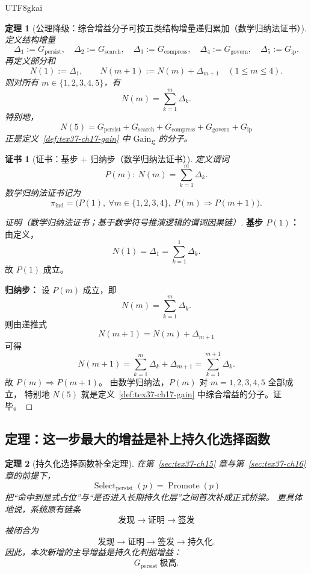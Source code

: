 \documentclass[12pt]{article}
\newtheorem{theorem}{定理}[section]
\newtheorem{Certificate}{证书}[section]
\newcommand{\Select}{\operatorname{Select}}
\newcommand{\Promote}{\operatorname{Promote}}
\begin{document}
\begin{CJK*}{UTF8}{gkai}
\begin{theorem}[公理降级：综合增益分子可按五类结构增量递归累加（数学归纳法证书）]
\label{thm:tex37-ch17-decomposition}
定义结构增量
\[
  \Delta_1:=G_{\mathrm{persist}},\quad
  \Delta_2:=G_{\mathrm{search}},\quad
  \Delta_3:=G_{\mathrm{compress}},\quad
  \Delta_4:=G_{\mathrm{govern}},\quad
  \Delta_5:=G_{\mathrm{ip}}.
\]
再定义部分和
\[
  N(1):=\Delta_1,
  \qquad
  N(m+1):=N(m)+\Delta_{m+1}
  \quad (1\le m\le 4).
\]
则对所有 $m\in\{1,2,3,4,5\}$，有
\[
  N(m)=\sum_{k=1}^{m}\Delta_k.
\]
特别地，
\[
  N(5)
  =
  G_{\mathrm{persist}}
  +
  G_{\mathrm{search}}
  +
  G_{\mathrm{compress}}
  +
  G_{\mathrm{govern}}
  +
  G_{\mathrm{ip}}
\]
正是定义~\ref{def:tex37-ch17-gain} 中 $\mathrm{Gain}_{\mathfrak L}$ 的分子。
\end{theorem}

\begin{Certificate}[证书：基步 + 归纳步（数学归纳法证书）]
\label{cert:tex37-ch17-decomposition}
定义谓词
\[
  P(m):\ N(m)=\sum_{k=1}^{m}\Delta_k.
\]
数学归纳法证书记为
\[
  \pi_{\mathrm{ind}}
  =
  \bigl(
    P(1),\
    \forall m\in\{1,2,3,4\},\ P(m)\Rightarrow P(m+1)
  \bigr).
\]
\end{Certificate}

\begin{proof}[证明（数学归纳法证书；基于数学符号推演逻辑的谓词因果链）]
\textbf{基步 $P(1)$：}
由定义，
\[
  N(1)=\Delta_1=\sum_{k=1}^{1}\Delta_k.
\]
故 $P(1)$ 成立。

\textbf{归纳步：}
设 $P(m)$ 成立，即
\[
  N(m)=\sum_{k=1}^{m}\Delta_k.
\]
则由递推式
\[
  N(m+1)=N(m)+\Delta_{m+1}
\]
可得
\[
  N(m+1)
  =
  \sum_{k=1}^{m}\Delta_k+\Delta_{m+1}
  =
  \sum_{k=1}^{m+1}\Delta_k.
\]
故 $P(m)\Rightarrow P(m+1)$。
由数学归纳法，$P(m)$ 对 $m=1,2,3,4,5$ 全部成立，
特别地 $N(5)$ 就是定义~\ref{def:tex37-ch17-gain} 中综合增益的分子。证毕。
\end{proof}

\subsection{定理：这一步最大的增益是补上持久化选择函数}
\label{subsec:tex37-ch17-theorem}

\begin{theorem}[持久化选择函数补全定理]
\label{thm:tex37-ch17-persist}
在第~\ref{sec:tex37-ch15} 章与第~\ref{sec:tex37-ch16} 章的前提下，
\[
  \Select_{\mathrm{persist}}(p)=\Promote(p)
\]
把“命中到显式占位”与“是否进入长期持久化层”之间首次补成正式桥梁。
更具体地说，系统原有链条
\[
  \text{发现}
  \to
  \text{证明}
  \to
  \text{签发}
\]
被闭合为
\[
  \text{发现}
  \to
  \text{证明}
  \to
  \text{签发}
  \to
  \text{持久化}.
\]
因此，本次新增的主导增益是持久化判据增益：
\[
  \boxed{
    G_{\mathrm{persist}}\ \text{极高}.
  }
\]
\end{theorem}


\end{CJK*}
\end{document}
